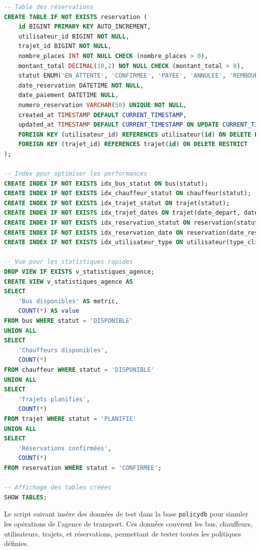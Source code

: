 \documentclass[12pt,a4paper]{article}
\begin{document}
\begin{tcolorbox}[codebox]
\begin{lstlisting}[language=SQL]
-- Table des réservations
CREATE TABLE IF NOT EXISTS reservation (
    id BIGINT PRIMARY KEY AUTO_INCREMENT,
    utilisateur_id BIGINT NOT NULL,
    trajet_id BIGINT NOT NULL,
    nombre_places INT NOT NULL CHECK (nombre_places > 0),
    montant_total DECIMAL(10,2) NOT NULL CHECK (montant_total > 0),
    statut ENUM('EN_ATTENTE', 'CONFIRMEE', 'PAYEE', 'ANNULEE', 'REMBOURSEE') NOT NULL DEFAULT 'EN_ATTENTE',
    date_reservation DATETIME NOT NULL,
    date_paiement DATETIME NULL,
    numero_reservation VARCHAR(50) UNIQUE NOT NULL,
    created_at TIMESTAMP DEFAULT CURRENT_TIMESTAMP,
    updated_at TIMESTAMP DEFAULT CURRENT_TIMESTAMP ON UPDATE CURRENT_TIMESTAMP,
    FOREIGN KEY (utilisateur_id) REFERENCES utilisateur(id) ON DELETE RESTRICT,
    FOREIGN KEY (trajet_id) REFERENCES trajet(id) ON DELETE RESTRICT
);

-- Index pour optimiser les performances
CREATE INDEX IF NOT EXISTS idx_bus_statut ON bus(statut);
CREATE INDEX IF NOT EXISTS idx_chauffeur_statut ON chauffeur(statut);
CREATE INDEX IF NOT EXISTS idx_trajet_statut ON trajet(statut);
CREATE INDEX IF NOT EXISTS idx_trajet_dates ON trajet(date_depart, date_arrivee);
CREATE INDEX IF NOT EXISTS idx_reservation_statut ON reservation(statut);
CREATE INDEX IF NOT EXISTS idx_reservation_date ON reservation(date_reservation);
CREATE INDEX IF NOT EXISTS idx_utilisateur_type ON utilisateur(type_client);

-- Vue pour les statistiques rapides
DROP VIEW IF EXISTS v_statistiques_agence;
CREATE VIEW v_statistiques_agence AS
SELECT
    'Bus disponibles' AS metric,
    COUNT(*) AS value
FROM bus WHERE statut = 'DISPONIBLE'
UNION ALL
SELECT
    'Chauffeurs disponibles',
    COUNT(*)
FROM chauffeur WHERE statut = 'DISPONIBLE'
UNION ALL
SELECT
    'Trajets planifiés',
    COUNT(*)
FROM trajet WHERE statut = 'PLANIFIE'
UNION ALL
SELECT
    'Réservations confirmées',
    COUNT(*)
FROM reservation WHERE statut = 'CONFIRMEE';

-- Affichage des tables créées
SHOW TABLES;
        \end{lstlisting}
    \end{tcolorbox}

    Le script suivant insère des données de test dans la base \texttt{policydb} pour simuler les opérations de l'agence de transport. Ces données couvrent les bus, chauffeurs, utilisateurs, trajets, et réservations, permettant de tester toutes les politiques définies.
\end{document}
